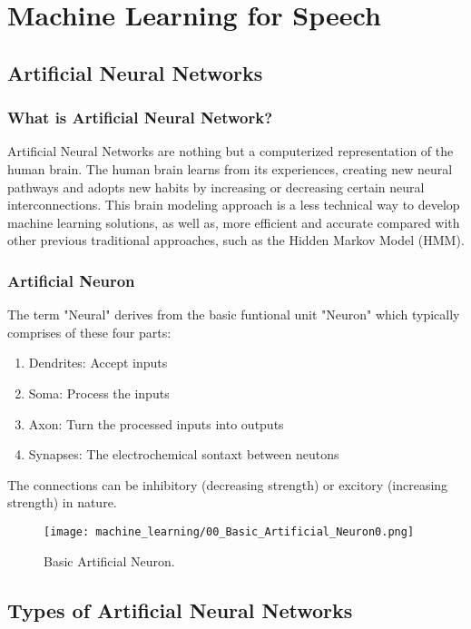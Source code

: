 \chapter{Machine Learning for Speech}\label{ch:machine_learning}

\section{Artificial Neural Networks}
\subsection{What is Artificial Neural Network?}
Artificial Neural Networks are nothing but a computerized representation of the human brain. The human brain learns from its experiences, creating new neural pathways and adopts new habits by increasing or decreasing certain neural interconnections. This brain modeling approach is a less technical way to develop machine learning solutions, as well as, more efficient and accurate compared with other previous traditional approaches, such as the Hidden Markov Model (HMM). 

\subsection{Artificial Neuron}
The term "Neural" derives from the basic funtional unit "Neuron" which typically comprises of these four parts:

\begin{enumerate}
  \item Dendrites: Accept inputs
  \item Soma: Process the inputs
  \item Axon: Turn the processed inputs into outputs
  \item Synapses: The electrochemical sontaxt between neutons 
\end{enumerate}

The connections can be inhibitory (decreasing strength) or excitory (increasing strength) in nature.

\begin{figure}[h]
\centering
\texttt{[image: machine\_learning/00\_Basic\_Artificial\_Neuron0.png]}
\caption{Basic Artificial Neuron.}
\label{fig:BAN}
\end{figure}

\section{Types of Artificial Neural Networks}
